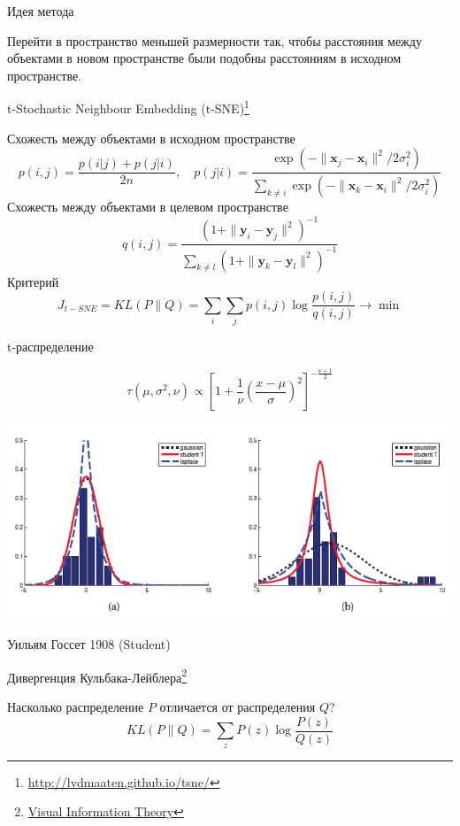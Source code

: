 \documentclass[aspectratio=169]{beamer}
\begin{document}
\begin{frame}{Идея метода}

Перейти в пространство меньшей размерности так, чтобы расстояния между объектами в новом пространстве были подобны расстояниям в исходном пространстве.

\end{frame}

\begin{frame}{t-Stochastic Neighbour Embedding (t-SNE)\footnote{\url{http://lvdmaaten.github.io/tsne/}}}

Схожесть между объектами в исходном пространстве
\[
p(i, j) = \frac{p(i | j) + p(j | i)}{2n}, \quad p(j | i) = \frac{\exp(-\|\mathbf{x}_j-\mathbf{x}_i\|^2/{2 \sigma_i^2})}{\sum_{k \neq i}\exp(-\|\mathbf{x}_k-\mathbf{x}_i\|^2/{2 \sigma_i^2})}
\]
Схожесть между объектами в целевом пространстве
\[
q(i, j) = \frac{(1 + \| \mathbf{y}_i - \mathbf{y}_j \|^2)^{-1}}{\sum_{k \neq l}(1 + \| \mathbf{y}_k - \mathbf{y}_l \|^2)^{-1}}
\]
Критерий
\[
J_{t-SNE} = KL(P \| Q) = \sum_i \sum_j p(i, j) \log \frac{p(i, j)}{q(i, j)} \rightarrow \min
\]

\end{frame}

\begin{frame}{t-распределение}

\[
\tau(\mu, \sigma^2, \nu) \propto \left[1 + \frac{1}{\nu}\left(\frac{x-\mu}{\sigma}\right)^2\right]^{-\frac{\nu+1}{2}}
\]

\begin{center}
\includegraphics[scale=0.4]{images/t-distr.png}
\end{center}

Уильям Госсет 1908 (Student)

\end{frame}

\begin{frame}{Дивергенция Кульбака-Лейблера\footnote{\href{http://colah.github.io/posts/2015-09-Visual-Information/}{Visual Information Theory}}}

Насколько распределение $P$ отличается от распределения $Q$?
\[
KL(P \| Q) = \sum_z P(z) \log \frac{P(z)}{Q(z)}
\]

\end{frame}
\end{document}
